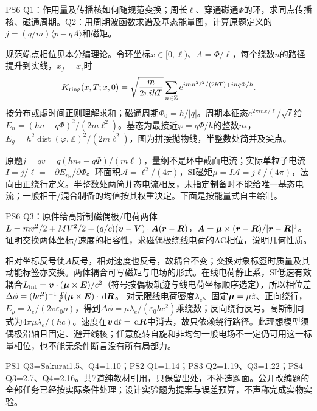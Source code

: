 \begin{exercise}
PS6 Q1：作用量及传播核如何随规范变换；周长$\ell$、穿通磁通$\Phi$的环，求同点传播核、磁通周期。Q2：用周期波函数求谱及基态能量图，计算原题定义的$j=(q/m)\langle p-qA\rangle$和磁矩。
\end{exercise}
\begin{solution}
规范端点相位见本分编理论。令环坐标$x\in[0,\ell)$、$A=\Phi/\ell$，每个绕数$n$的路径提升到实线，$x_f=x_i$时
\[
 K_{\rm ring}(x,T;x,0)=\sqrt{\frac m{2\pi i\hbar T}}
 \sum_{n\in\mathbb Z}e^{imn^2\ell^2/(2\hbar T)+inq\Phi/\hbar}.
\]
按分布或虚时间正则理解求和；磁通周期$\Phi_0=h/|q|$。周期本征态$e^{2\pi inx/\ell}/\sqrt\ell$给$E_n=(h n-q\Phi)^2/(2m\ell^2)$。基态为最接近$\varphi=q\Phi/h$的整数$n_*$，$E_g=h^2\operatorname{dist}(\varphi,\mathbb Z)^2/(2m\ell^2)$，图为拼接抛物线，半整数处简并及尖点。

原题$j=qv=q(hn_*-q\Phi)/(m\ell)$，量纲不是环中截面电流；实际单粒子电流$I=j/\ell=-\partial E_{n_*}/\partial\Phi$。环面积$\mathcal A=\ell^2/(4\pi)$，SI磁矩$\mu=I\mathcal A=j\ell/(4\pi)$，法向由正绕行定义。半整数处两简并态电流相反，未指定制备时不能给唯一基态电流；一般相干/混合制备的均值按其权重决定。下面是按能量式自主绘制。
\end{solution}
\begin{center}\end{center}
\begin{exercise}
PS6 Q3：原件给高斯制磁偶极/电荷两体$L=mv^2/2+MV^2/2+(q/c)(\boldsymbol{v}-\boldsymbol{V})\cdot\boldsymbol{A}(\boldsymbol{r}-\boldsymbol{R})$，$\boldsymbol{A}=\boldsymbol{\mu}\times(\boldsymbol{r}-\boldsymbol{R})/|\boldsymbol{r}-\boldsymbol{R}|^3$。证明交换两体坐标/速度的相容性，求磁偶极绕线电荷的AC相位，说明几何性质。
\end{exercise}
\begin{solution}
相对坐标反号使$A$反号，相对速度也反号，故耦合不变；交换对象标签时质量及其动能标签亦交换。两体耦合可写磁矩与电场的形式。在线电荷静止系，SI低速有效耦合$L_{\rm int}=\boldsymbol{v}\cdot(\boldsymbol{\mu}\times\boldsymbol{E})/c^2$（符号按偶极轨迹与线电荷坐标顺序选定），所以相位差
$\Delta\phi=(\hbar c^2)^{-1}\oint(\boldsymbol{\mu}\times\boldsymbol{E})\cdot\,\mathrm d\boldsymbol{R}$。
对无限线电荷密度$\lambda_e$、固定$\boldsymbol{\mu}=\mu\hat z$、正向绕行，$E_\rho=\lambda_e/(2\pi\varepsilon_0\rho)$，得到$\Delta\phi=\mu\lambda_e/(\varepsilon_0\hbar c^2)$乘绕数；反向绕行反号。高斯制同式为$4\pi\mu\lambda_e/(\hbar c)$。速度在$\boldsymbol{v}\,\mathrm d t=\,\mathrm d\boldsymbol{R}$中消去，故只依赖绕行路径。此理想模型须偶极沿轴且固定、避开线核；任意旋转自旋和非均匀一般电场不一定仍可用这一标量相位，也不能无条件断言没有所有局部力。
\end{solution}

PS1 Q3=Sakurai1.5、Q4=1.10；PS2 Q1=1.14；PS3 Q2=1.19、Q3=1.22；PS4 Q3=2.7、Q4=2.16。共7道纯教材引用，只保留出处，不补造题面。公开改编题的全部任务已经按实际条件处理；设计实验题为提案与误差预算，不声称完成实物实验。
